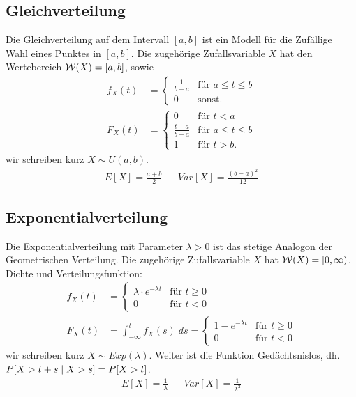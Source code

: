 \subsection*{Gleichverteilung}
Die Gleichverteilung auf dem Intervall $[a, b]$ ist ein Modell für die
Zufällige Wahl eines Punktes in $[a, b]$. Die zugehörige Zufallsvariable $X$
hat den Wertebereich $\mathcal{W} (X) = [a, b]$, sowie
\begin{align*}
  f_X (t) & =
  \begin{cases}
    \frac{1}{b-a} & \text{für } a \leq t \leq b \\
    0             & \text{sonst.}
  \end{cases} \\
  F_X (t) & =
  \begin{cases}
    0               & \text{für } t < a           \\
    \frac{t-a}{b-a} & \text{für } a \leq t \leq b \\
    1               & \text{für } t > b.
  \end{cases}
\end{align*}
wir schreiben kurz $X \sim U (a, b)$.
\begin{align*}
  E[X] = \frac{a + b}{2} &  & Var[X] = \frac{{(b - a)}^2}{12}
\end{align*}
\subsection*{Exponentialverteilung}
Die Exponentialverteilung mit Parameter $\lambda > 0$ ist das stetige Analogon
der Geometrischen Verteilung. Die zugehörige Zufallsvariable $X$ hat $\mathcal{W} (X) =
  [0, \infty)$, Dichte und Verteilungsfunktion:
\begin{align*}
  f_X (t) & =
  \begin{cases}
    \lambda \cdot e^{-\lambda t} & \text{für } t \geq 0 \\
    0                            & \text{für }t < 0
  \end{cases} \\
  F_X (t) & =
  \int_{-\infty}^t f_X (s) \; ds =
  \begin{cases}
    1 - e^{-\lambda t} & \text{für } t \geq 0 \\
    0                  & \text{für }t < 0
  \end{cases}
\end{align*}
wir schreiben kurz $X \sim Exp (\lambda)$. Weiter ist
die Funktion Gedächtsnislos, dh. $P[X > t + s \; | \; X > s] = P[X > t]$.
\begin{align*}
  E[X] = \frac{1}{\lambda} &  & Var[X] = \frac{1}{\lambda^2}
\end{align*}
